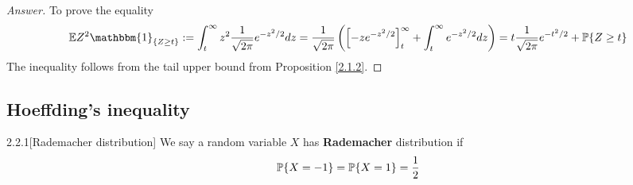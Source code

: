\begin{proof}[Answer]
To prove the equality
\begin{align*}
    \E Z^2 \mathbbm{1}_{\{Z\geq t\}} := \int^\infty_t z^2 \frac 1 {\sqrt{2\pi}}e^{-z^2/2} dz = \frac 1 {\sqrt{2\pi}}\l(\l[-ze^{-z^2/2}\r]^\infty_t + \int^\infty_t e^{-z^2/2} dz\r) 
    =t\frac1{\sqrt{2\pi}}e^{-t^2/2} + \P\{Z \geq t\}
\end{align*}
The inequality follows from the tail upper bound from Proposition \ref{2.1.2}.
\end{proof}
\subsection{Hoeffding's inequality}

\begin{defn}{2.2.1}[Rademacher distribution]\label{2.2.1} We say a random variable $X$ has \textbf{Rademacher} distribution if
\begin{align*}
    \P\{X = -1\} = \P\{X = 1\} = \frac 1 2
\end{align*}
\end{defn}

